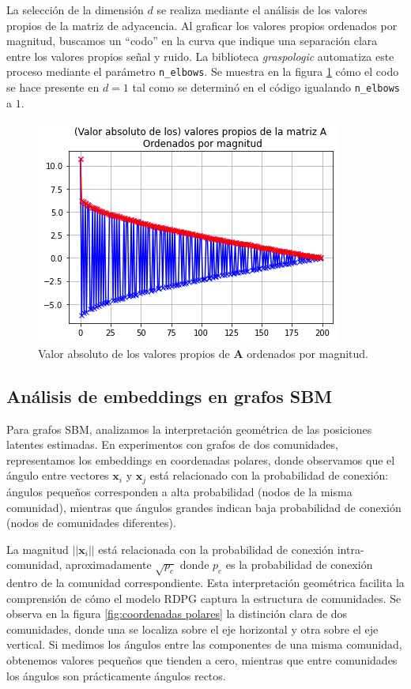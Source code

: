 \documentclass{article}
\begin{document}
La selección de la dimensión $d$ se realiza mediante el análisis de los valores propios de la matriz de adyacencia. Al graficar los valores propios ordenados por magnitud, buscamos un ``codo'' en la curva que indique una separación clara entre los valores propios señal y ruido. La biblioteca \textit{graspologic} automatiza este proceso mediante el parámetro \verb|n_elbows|. Se muestra en la figura \ref{fig:valores propios} cómo el codo se hace presente en $d=1$ tal como se determinó en el código igualando \verb|n_elbows| a $1$. 

\begin{figure}[htb]
    \centering
    \includegraphics[width=0.5\linewidth]{images/valores_propios.png}
    \caption{Valor absoluto de los valores propios de $\mathbf{A}$ ordenados por magnitud.}
    \label{fig:valores propios}
\end{figure}

\subsection{Análisis de embeddings en grafos SBM}

Para grafos SBM, analizamos la interpretación geométrica de las posiciones latentes estimadas. En experimentos con grafos de dos comunidades, representamos los embeddings en coordenadas polares, donde observamos que el ángulo entre vectores $\mathbf{x}_i$ y $\mathbf{x}_j$ está relacionado con la probabilidad de conexión: ángulos pequeños corresponden a alta probabilidad (nodos de la misma comunidad), mientras que ángulos grandes indican baja probabilidad de conexión (nodos de comunidades diferentes).

La magnitud $||\mathbf{x}_i||$ está relacionada con la probabilidad de conexión intra-comunidad, aproximadamente $\sqrt{p_c}$ donde $p_c$ es la probabilidad de conexión dentro de la comunidad correspondiente. Esta interpretación geométrica facilita la comprensión de cómo el modelo RDPG captura la estructura de comunidades. Se observa en la figura \ref{fig:coordenadas polares} la distinción clara de dos comunidades, donde una se localiza sobre el eje horizontal y otra sobre el eje vertical. Si medimos los ángulos entre las componentes de una misma comunidad, obtenemos valores pequeños que tienden a cero, mientras que entre comunidades los ángulos son prácticamente ángulos rectos.
\end{document}
